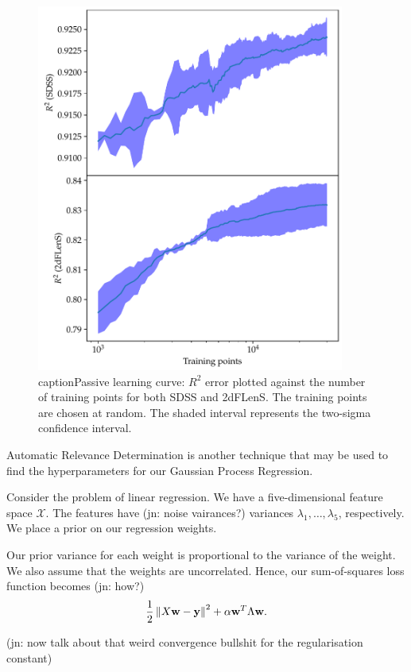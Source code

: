 \documentclass[11pt,twoside]{report}
\newcommand\bw{\mathbf{w}}
\newcommand\by{\mathbf{y}}
\newcommand\cX{\mathcal{X}}
\newcommand\norm[1]{\left\|#1\right\|}
\newcommand\jn[1]{{\color{red}(jn: #1)}}
\begin{document}
  \begin{figure}
    \centering
    \includegraphics[width=0.9\textwidth]{passive_r2.pdf}
    caption{Passive learning curve: $R^2$ error plotted against the number of training points for both SDSS and 2dFLenS. The training points are chosen at random. The shaded interval represents the two-sigma confidence interval.}
    \label{fig:passive_r2}
  \end{figure}

Automatic Relevance Determination is another technique that may be used to find the hyperparameters for our Gaussian Process Regression.

Consider the problem of linear regression. We have a five-dimensional feature space $\cX$. The features have \jn{noise vairances?} variances $\lambda_1, \dots, \lambda_5$, respectively. We place a prior on our regression weights.

Our prior variance for each weight is proportional to the variance of the weight. We also assume that the weights are uncorrelated. Hence, our sum-of-squares loss function becomes \jn{how?}\[
    \frac12\norm{X\bw - \by}^2 + \alpha \bw^T \Lambda \bw \text.
\]

\jn{now talk about that weird convergence bullshit for the regularisation constant}
\end{document}
